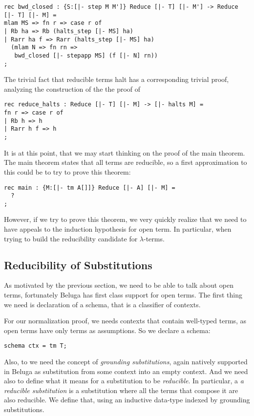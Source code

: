 \begin{lstlisting}
rec bwd_closed : {S:[|- step M M']} Reduce [|- T] [|- M'] -> Reduce [|- T] [|- M] =
mlam MS => fn r => case r of
| Rb ha => Rb (halts_step [|- MS] ha)
| Rarr ha f => Rarr (halts_step [|- MS] ha)
  (mlam N => fn rn =>
   bwd_closed [|- stepapp MS] (f [|- N] rn))
;
\end{lstlisting}

The trivial fact that reducible terms halt has a corresponding
trivial proof, analyzing the construction of the the proof of

\begin{lstlisting}
rec reduce_halts : Reduce [|- T] [|- M] -> [|- halts M] =
fn r => case r of
| Rb h => h
| Rarr h f => h
;
\end{lstlisting}

It is at this point, that we may start thinking on the proof of the
main theorem. The main theorem states that all terms are reducible, so
a first approximation to this could be to try to prove this theorem:

\begin{lstlisting}
rec main : {M:[|- tm A[]]} Reduce [|- A] [|- M] =
  ?
;
\end{lstlisting}

However, if we try to prove this theorem, we very quickly realize that
we need to have appeals to the induction hypothesis for open term. In
particular, when trying to build the reducibility candidate for
$\lambda$-terms.

\subsection{Reducibility of Substitutions}

As motivated by the previous section, we need to be able to talk about
open terms, fortunately Beluga has first class support for open
terms. The first thing we need is declaration of a schema, that is a
classifier of contexts.

For our normalization proof, we needs contexts that contain well-typed
terms, as open terms have only terms as assumptions. So we declare a schema:
\begin{lstlisting}
schema ctx = tm T;
\end{lstlisting}

Also, to  we need the concept of \emph{grounding substitutions}, again
natively supported in Beluga as substitution from some context into an
empty context. And we need also to define what it means for a
substitution to be \emph{reducible}. In particular, a \emph{a
  reducible substitution} is a substitution where all the terms that
compose it are also reducible. We define that, using an inductive
data-type indexed by grounding substitutions.

